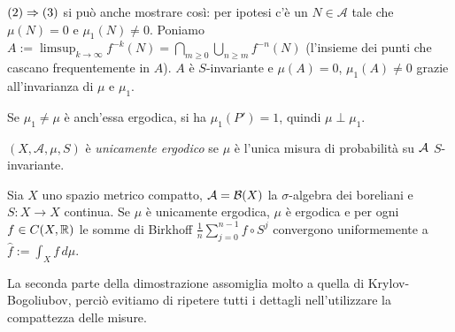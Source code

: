 \begin{oss}$(2)\Rightarrow (3)$ si può anche mostrare così: per ipotesi c'è un $N\in\mathcal{A}$ tale che $\mu(N)=0$ e $\mu_1(N)\neq 0$.
Poniamo $A:=\limsup_{k\to\infty}f^{-k}(N)=\bigcap_{m\ge 0}\bigcup_{n\ge m}f^{-n}(N)$ (l'insieme dei punti che
cascano frequentemente in $A$). $A$ è $S$-invariante e $\mu(A)=0$, $\mu_1(A)\neq 0$ grazie all'invarianza di $\mu$ e $\mu_1$.
\end{oss}

\begin{oss}Se $\mu_1\neq\mu$ è anch'essa ergodica, si ha $\mu_1(P')=1$, quindi $\mu\perp\mu_1$.
\end{oss}

\begin{defi}$(X,\mathcal{A},\mu,S)$ è \emph{unicamente ergodico} se $\mu$ è l'unica misura di probabilità su $\mathcal{A}$
$S$-invariante.
\end{defi}

\begin{teo}Sia $X$ uno spazio metrico compatto, $\mathcal{A}=\mathcal{B}(X)$ la $\sigma$-algebra dei boreliani
e $S:X\to X$ continua. Se $\mu$ è unicamente ergodica, $\mu$ è ergodica e per ogni $f\in C(X,\mathbb{R})$
le somme di Birkhoff $\frac{1}{n}\sum_{j=0}^{n-1}f\circ S^j$ convergono uniformemente a $\widehat{f}:=\int_X f\,d\mu$.
\end{teo}

La seconda parte della dimostrazione assomiglia molto a quella di Krylov-Bogoliubov,
perciò evitiamo di ripetere tutti i dettagli nell'utilizzare la compattezza delle misure.

